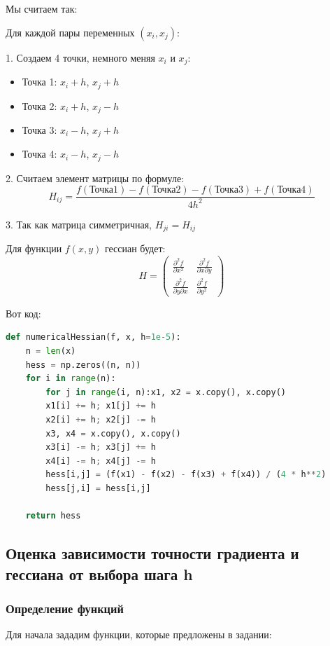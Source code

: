 \documentclass[a4paper,12pt]{article}
\begin{document}
Мы считаем так:

Для каждой пары переменных $(x_i, x_j)$:

1. Создаем 4 точки, немного меняя $x_i$ и $x_j$:
\begin{itemize}
	\item Точка 1: $x_i + h$, $x_j + h$
	\item Точка 2: $x_i + h$, $x_j - h$
	\item Точка 3: $x_i - h$, $x_j + h$
	\item Точка 4: $x_i - h$, $x_j - h$
\end{itemize}

2. Считаем элемент матрицы по формуле:
\[
H_{ij} = \frac{f(\text{Точка1}) - f(\text{Точка2}) - f(\text{Точка3}) + f(\text{Точка4})}{4h^2}
\]

3. Так как матрица симметричная, $H_{ji} = H_{ij}$

Для функции $f(x,y)$ гессиан будет:
\[
H = \begin{pmatrix}
	\frac{\partial^2 f}{\partial x^2} & \frac{\partial^2 f}{\partial x \partial y} \\
	\frac{\partial^2 f}{\partial y \partial x} & \frac{\partial^2 f}{\partial y^2}
\end{pmatrix}
\]

Вот код:
\begin{lstlisting}[language=python, caption={Гессиан}]
def numericalHessian(f, x, h=1e-5):
	n = len(x)
	hess = np.zeros((n, n))
	for i in range(n):
		for j in range(i, n):x1, x2 = x.copy(), x.copy()
		x1[i] += h; x1[j] += h
		x2[i] += h; x2[j] -= h
		x3, x4 = x.copy(), x.copy()
		x3[i] -= h; x3[j] += h
		x4[i] -= h; x4[j] -= h
		hess[i,j] = (f(x1) - f(x2) - f(x3) + f(x4)) / (4 * h**2)
		hess[j,i] = hess[i,j]
			
	return hess
\end{lstlisting}

\subsection{Оценка зависимости точности градиента и гессиана от выбора шага h}

\subsubsection{Определение функций}
\label{subsec:methods}

Для начала зададим функции, которые предложены в задании:
\end{document}
